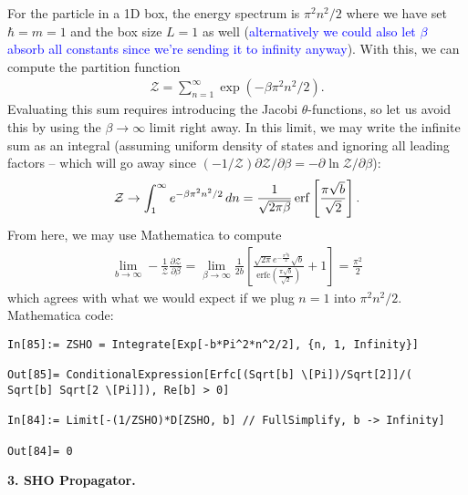 \documentclass{article}
\theoremstyle{definition}
\newcommand{\p}{\partial}
\newcommand{\be}{\beta}
\newcommand{\f}[2]{\frac{#1}{#2}}
\newcommand{\lb}{\left[}
\newcommand{\rb}{\right]}
\begin{document}
For the particle in a 1D box, the energy spectrum is $\pi^2 n^2/2$ where we have set $\hbar = m = 1$ and the box size $L=1$ as well (\textcolor{blue}{alternatively we could also let $\be$ absorb all constants since we're sending it to infinity anyway}). With this, we can compute the partition function 
\begin{align*}
\mathcal{Z} = \sum^\infty_{n=1} \exp(-\be \pi^2 n^2/2).
\end{align*}
Evaluating this sum requires introducing the Jacobi $\theta$-functions, so let us avoid this by using the $\be\to \infty$ limit right away. In this limit, we may write the infinite sum as an integral (assuming uniform density of states and ignoring all leading factors -- which will go away since $(-1/\mathcal{Z})\p \mathcal{Z}/\p \be = -\p \ln\mathcal{Z}/\p \be$):
\begin{align*}
\mathcal{Z} \to \int_1^\infty e^{-\be \pi^2 n^2/2}\,dn = \f{1}{\sqrt{2\pi \be}} \erf\lb \f{\pi \sqrt{b}}{\sqrt{2}}\rb.
\end{align*}
From here, we may use Mathematica to compute 
\begin{align*}
\lim_{b\to \infty}-\f{1}{\mathcal{Z}} \f{\p \mathcal{Z}}{\p \be} = \lim_{\be\to \infty} \f{1}{2b}\lb {\frac{\sqrt{2 \pi } e^{-\frac{\pi ^2 b}{2}} \sqrt{b}}{\text{erfc}\left(\frac{\pi  \sqrt{b}}{\sqrt{2}}\right)}+1}\rb = \boxed{\f{\pi^2}{2}}
\end{align*}
which agrees with what we would expect if we plug $n=1$ into $\pi^2 n^2 /2$. \\


Mathematica code:
\begin{lstlisting}
In[85]:= ZSHO = Integrate[Exp[-b*Pi^2*n^2/2], {n, 1, Infinity}]

Out[85]= ConditionalExpression[Erfc[(Sqrt[b] \[Pi])/Sqrt[2]]/(
Sqrt[b] Sqrt[2 \[Pi]]), Re[b] > 0]

In[84]:= Limit[-(1/ZSHO)*D[ZSHO, b] // FullSimplify, b -> Infinity]

Out[84]= 0
\end{lstlisting}




\noindent \textbf{3. SHO Propagator.}
\end{document}
